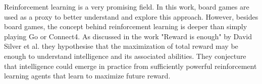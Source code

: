 \documentclass{article}
\begin{document}
Reinforcement learning is a very promising field. In this work, board games are used as a proxy to better understand and explore this approach. However, besides board games, the concept behind reinforcement learning is deeper than simply playing Go or Connect4. As discussed in the work "Reward is enough"\cite{SILVER2021103535} by David Silver et al. they hypothesise that the maximization of total reward may be enough to understand intelligence and its associated abilities. They conjecture that intelligence could emerge in practice from sufficiently powerful reinforcement learning agents that learn to maximize future reward.

\pagebreak

\printbibliography
\end{document}
